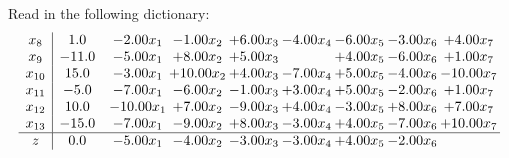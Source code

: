 \documentclass[9pt]{article}
\begin{document}
Read in the following dictionary:
\[\begin{array}{c| c c@{\hskip 2pt} c@{\hskip 2pt} c@{\hskip 2pt} c@{\hskip 2pt} c@{\hskip 2pt} c@{\hskip 2pt} c@{\hskip 2pt} }
 x_{8}   &  1.0 & -2.00 x_{1} & -1.00 x_{2} & +  6.00 x_{3} & -4.00 x_{4} & -6.00 x_{5} & -3.00 x_{6} & +  4.00 x_{7}\\
 x_{9}   &  -11.0 & -5.00 x_{1} & +  8.00 x_{2} & +  5.00 x_{3} &   & +  4.00 x_{5} & -6.00 x_{6} & +  1.00 x_{7}\\
 x_{10}   &  15.0 & -3.00 x_{1} & + 10.00 x_{2} & +  4.00 x_{3} & -7.00 x_{4} & +  5.00 x_{5} & -4.00 x_{6} & -10.00 x_{7}\\
 x_{11}   &  -5.0 & -7.00 x_{1} & -6.00 x_{2} & -1.00 x_{3} & +  3.00 x_{4} & +  5.00 x_{5} & -2.00 x_{6} & +  1.00 x_{7}\\
 x_{12}   &  10.0 & -10.00 x_{1} & +  7.00 x_{2} & -9.00 x_{3} & +  4.00 x_{4} & -3.00 x_{5} & +  8.00 x_{6} & +  7.00 x_{7}\\
 x_{13}   &  -15.0 & -7.00 x_{1} & -9.00 x_{2} & +  8.00 x_{3} & -3.00 x_{4} & +  4.00 x_{5} & -7.00 x_{6} & + 10.00 x_{7}\\
\hline
z    &  0.0 & -5.00 x_{1} & -4.00 x_{2} & -3.00 x_{3} & -3.00 x_{4} & +  4.00 x_{5} & -2.00 x_{6} &   \\
\end{array}\]
\end{document}
